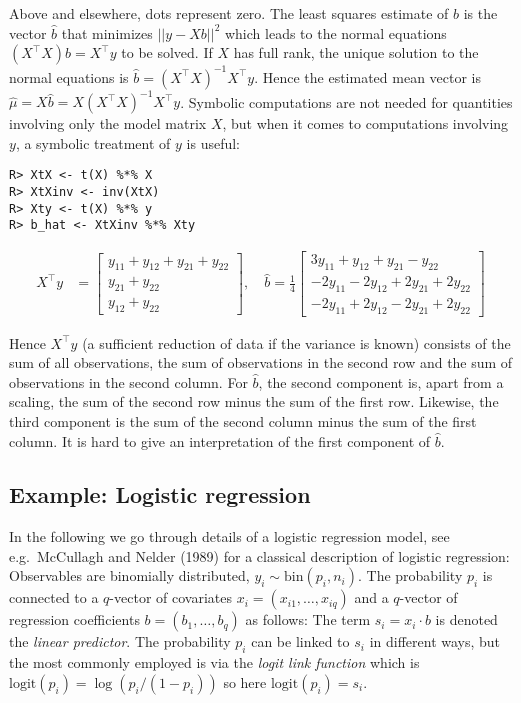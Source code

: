 Above and elsewhere, dots represent zero.
The least squares estimate of \(b\) is the vector \(\hat{b}\) that minimizes \(||y-X b||^2\) which leads to the normal equations \((X^\top X)b = X^\top y\) to be solved. If \(X\) has full rank, the unique solution to the normal
equations is \(\hat{b} = (X^\top X)^{-1} X^\top y\). Hence the
estimated mean vector is \(\hat \mu = X\hat{b}=X(X^\top X)^{-1} X^\top y\). Symbolic computations are
not needed for quantities involving only the model matrix \(X\), but
when it comes to computations involving \(y\), a symbolic treatment of
\(y\) is useful:

\begin{verbatim}
R> XtX <- t(X) %*% X
R> XtXinv <- inv(XtX)
R> Xty <- t(X) %*% y
R> b_hat <- XtXinv %*% Xty
\end{verbatim}

\begin{align}
X^\top y &= \left[\begin{matrix}y_{11} + y_{12} + y_{21} + y_{22}\\y_{21} + y_{22}\\y_{12} + y_{22}\end{matrix}\right] , 
\quad
\hat{b} = \frac{1}{4}  \left[\begin{matrix}3 y_{11} + y_{12} + y_{21} - y_{22}\\- 2 y_{11} - 2 y_{12} + 2 y_{21} + 2 y_{22}\\- 2 y_{11} + 2 y_{12} - 2 y_{21} + 2 y_{22}\end{matrix}\right]
\end{align}

Hence \(X^\top y\) (a sufficient reduction of data if the variance is known)
consists of the sum of all observations, the sum of
observations in the second row and the sum of observations in the second column. For \(\hat{b}\), the second component is, apart from a scaling, the sum of the second row minus the sum of the first row. Likewise, the third component is the sum of the second column minus the sum of the first column. It is hard to give an interpretation of the first component of \(\hat{b}\).

\hypertarget{example-logistic-regression}{%
\subsection{Example: Logistic regression}\label{example-logistic-regression}}

In the following we go through details of a logistic regression model,
see e.g.~McCullagh and Nelder (1989) for a classical description of logistic
regression: Observables are binomially distributed, \(y_i \sim \text{bin}(p_i, n_i)\). The probability \(p_i\) is connected to a
\(q\)-vector of covariates \(x_i=(x_{i1}, \dots, x_{iq})\) and a
\(q\)-vector of regression coefficients \(b=(b_1, \dots, b_q)\) as
follows: The term \(s_i = x_i \cdot b\) is denoted the \emph{linear
predictor}. The probability \(p_i\) can be linked to \(s_i\) in different
ways, but the most commonly employed is via the \emph{logit link
function} which is \(\text{logit}(p_i) = \log(p_i/(1-p_i))\) so here
\(\text{logit}(p_i) = s_i\).

